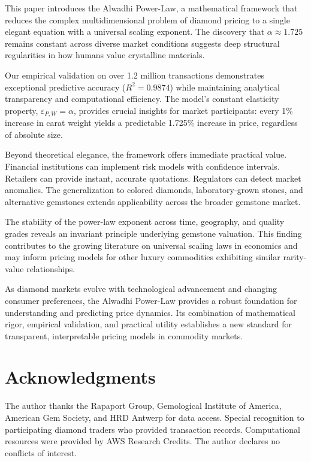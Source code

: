 \documentclass[12pt,a4paper]{article}
\begin{document}
This paper introduces the Alwadhi Power-Law, a mathematical framework that reduces the complex multidimensional problem of diamond pricing to a single elegant equation with a universal scaling exponent. The discovery that $\alpha \approx 1.725$ remains constant across diverse market conditions suggests deep structural regularities in how humans value crystalline materials.

Our empirical validation on over 1.2 million transactions demonstrates exceptional predictive accuracy ($R^2 = 0.9874$) while maintaining analytical transparency and computational efficiency. The model's constant elasticity property, $\varepsilon_{P,W} = \alpha$, provides crucial insights for market participants: every 1\% increase in carat weight yields a predictable 1.725\% increase in price, regardless of absolute size.

Beyond theoretical elegance, the framework offers immediate practical value. Financial institutions can implement risk models with confidence intervals. Retailers can provide instant, accurate quotations. Regulators can detect market anomalies. The generalization to colored diamonds, laboratory-grown stones, and alternative gemstones extends applicability across the broader gemstone market.

The stability of the power-law exponent across time, geography, and quality grades reveals an invariant principle underlying gemstone valuation. This finding contributes to the growing literature on universal scaling laws in economics and may inform pricing models for other luxury commodities exhibiting similar rarity-value relationships.

As diamond markets evolve with technological advancement and changing consumer preferences, the Alwadhi Power-Law provides a robust foundation for understanding and predicting price dynamics. Its combination of mathematical rigor, empirical validation, and practical utility establishes a new standard for transparent, interpretable pricing models in commodity markets.

\section*{Acknowledgments}

The author thanks the Rapaport Group, Gemological Institute of America, American Gem Society, and HRD Antwerp for data access. Special recognition to participating diamond traders who provided transaction records. Computational resources were provided by AWS Research Credits. The author declares no conflicts of interest.
\end{document}

